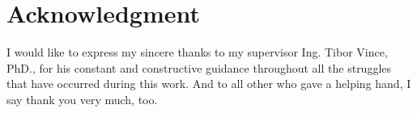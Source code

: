 \documentclass[journal]{IEEEtran}
\begin{document}
\newpage
\section*{Acknowledgment}
I would like to express my sincere thanks to my supervisor Ing. Tibor Vince,
PhD., for his constant and constructive guidance throughout all the struggles that
have occurred during this work. And to all other who gave a helping hand, I say
thank you very much, too.


\printbibliography
\end{document}
